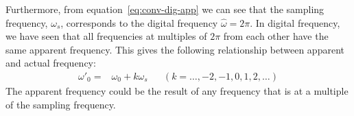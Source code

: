 Furthermore, from equation~\ref{eq:conv-dig-app} we can see that the sampling frequency, $\omega_s$, corresponds to the digital frequency $\hat{\omega}=2\pi$. In digital frequency, we have seen that all frequencies at multiples of $2\pi$ from each other have the same apparent frequency. This gives the following relationship between apparent and actual frequency:
 \begin{align}
 \omega'_0 =&\omega_0 + k \omega_s && (k = \ldots, -2, -1, 0, 1, 2, \ldots)
 \end{align}
The apparent frequency could be the result of any frequency that is at a multiple of the sampling frequency. 

%
% 
%

